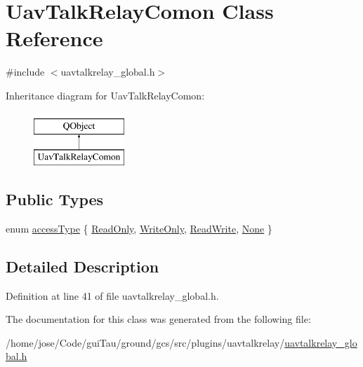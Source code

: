 \hypertarget{class_uav_talk_relay_comon}{\section{Uav\-Talk\-Relay\-Comon Class Reference}
\label{class_uav_talk_relay_comon}
}


{\ttfamily \#include $<$uavtalkrelay\-\_\-global.\-h$>$}

Inheritance diagram for Uav\-Talk\-Relay\-Comon\-:\begin{figure}[H]
\begin{center}
\leavevmode
\includegraphics[height=2.000000cm]{class_uav_talk_relay_comon}
\end{center}
\end{figure}
\subsection*{Public Types}
\begin{DoxyCompactItemize}
\item 
enum \hyperlink{group___u_a_v_talk_plugin_gae73e1677650d617d825cf2224fa0626a}{access\-Type} \{ \hyperlink{group___u_a_v_talk_plugin_ggae73e1677650d617d825cf2224fa0626aa957fb229d0cc0c660145b9e1287ad8e1}{Read\-Only}, 
\hyperlink{group___u_a_v_talk_plugin_ggae73e1677650d617d825cf2224fa0626aa024baabb3a664e953e20d4022ce393fa}{Write\-Only}, 
\hyperlink{group___u_a_v_talk_plugin_ggae73e1677650d617d825cf2224fa0626aacc91949972bbaf73f88f2e814994481e}{Read\-Write}, 
\hyperlink{group___u_a_v_talk_plugin_ggae73e1677650d617d825cf2224fa0626aa83e6c2ba48be7947d0d526ba645c6ee4}{None}
 \}
\end{DoxyCompactItemize}


\subsection{Detailed Description}


Definition at line 41 of file uavtalkrelay\-\_\-global.\-h.



The documentation for this class was generated from the following file\-:\begin{DoxyCompactItemize}
\item 
/home/jose/\-Code/gui\-Tau/ground/gcs/src/plugins/uavtalkrelay/\hyperlink{uavtalkrelay__global_8h}{uavtalkrelay\-\_\-global.\-h}\end{DoxyCompactItemize}
